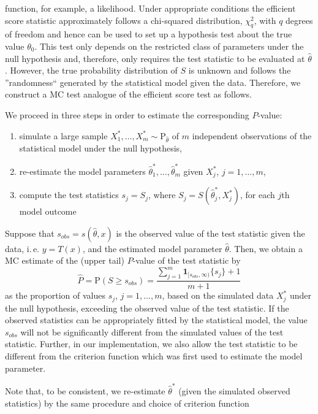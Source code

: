 \documentclass[article, nojss]{jss}
\numberwithin{equation}{section}			%
\begin{document}
function, for example, a likelihood. Under appropriate conditions the efficient score statistic
approximately follows a chi-squared distribution, $\chi^2_{q}$, with $q$ degrees of freedom
\citep[see, e.\,g.][sect.~9.2]{ref:Heyde1997} and hence can be used to set up a
hypothesis test about the true value $\theta_0$. This test only depends on the
restricted class of parameters under the null hypothesis and, therefore, only
requires the test statistic to be evaluated at $\hat{\theta}$. However, the true probability
distribution of $S$ is unknown and follows the ''randomness`` generated by the
statistical model given the data. Therefore, we construct a MC test analogue of the efficient
score test as follows.\par
%
We proceed in three steps \citep[see, e.\,g.][pp. 53-56]{efron1994} in order to
estimate the corresponding $P$-value:
\begin{enumerate}
  \item simulate a large sample $X^*_1,\ldots,X^*_m \sim
  \mathrm{P}_{\hat{\theta}}$ of $m$ independent observations of the
  statistical model under the null hypothesis,
  \item re-estimate the model parameters
  $\hat{\theta}^*_1,\ldots,\hat{\theta}^*_m$ given $X^*_j$, $j=1,\ldots,m$, 
  \item compute the test statistics $s_j=S_j$, where
  $S_j=S(\hat{\theta}^*_j,X^*_j)$, for each $j$th model outcome
\end{enumerate}
Suppose that $s_{obs} = s(\hat{\theta},x)$ is the observed value of the test
statistic given the data, i.\,e. $y=T(x)$, and the estimated model parameter
$\hat{\theta}$. Then, we obtain a MC estimate of the (upper tail) $P$-value of the test
statistic by
\[
  \hat{P} = \hat{\mathrm{P}}(S\geq s_{obs}) = \frac{\sum_{j=1}^m \mathbf{1}_{[s_{obs},\infty)} \{s_j\}+1}{m+1}  
\]
as the proportion of values $s_j$, $j=1,\ldots,m$, based on the
simulated data $X^*_j$ under the null hypothesis, exceeding the observed value of
the test statistic. If the observed statistics can be appropriately fitted by
the statistical model, the value $s_{obs}$ will not be significantly different from the simulated
values of the test statistic. Further, in our implementation, we also allow the
test statistic to be different from the criterion function which was first used to
estimate the model parameter.\par
%
Note that, to be consistent, we re-estimate $\hat{\theta}^*$ (given the
simulated observed statistics) by the same procedure and choice of criterion function
\end{document}
